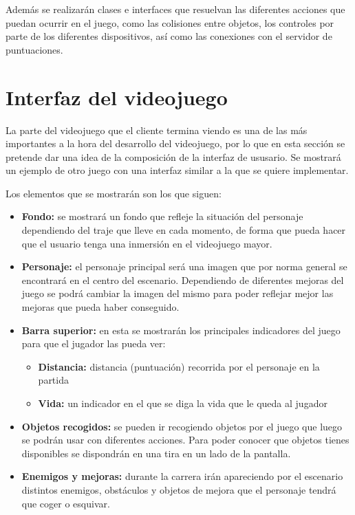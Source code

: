 \documentclass[palatino]{apuntes}
\begin{document}
Además se realizarán clases e interfaces que resuelvan las diferentes acciones que puedan ocurrir en el juego, como las colisiones entre objetos, los controles por parte de los diferentes dispositivos, así como las conexiones con el servidor de puntuaciones.


\section{Interfaz del videojuego}
La parte del videojuego que el cliente termina viendo es una de las más importantes a la hora del desarrollo del videojuego, por lo que en esta sección se pretende dar una idea de la composición de la interfaz de ususario. Se mostrará un ejemplo de otro juego con una interfaz similar a la que se quiere implementar.

Los elementos que se mostrarán son los que siguen:
\begin{itemize}
	\item \textbf{Fondo:} se mostrará un fondo que refleje la situación del personaje dependiendo del traje que lleve en cada momento, de forma que pueda hacer que el usuario tenga una inmersión en el videojuego mayor.
	\item \textbf{Personaje:} el personaje principal será una imagen que por norma general se encontrará en el centro del escenario. Dependiendo de diferentes mejoras del juego se podrá cambiar la imagen del mismo para poder reflejar mejor las mejoras que pueda haber conseguido.
	\item \textbf{Barra superior:} en esta se mostrarán los principales indicadores del juego para que el jugador las pueda ver:
		\begin{itemize}
			\item \textbf{Distancia:} distancia (puntuación) recorrida por el personaje en la partida
			\item \textbf{Vida:} un indicador en el que se diga la vida que le queda al jugador
		\end{itemize}
	\item \textbf{Objetos recogidos:} se pueden ir recogiendo objetos por el juego que luego se podrán usar con diferentes acciones. Para poder conocer que objetos tienes disponibles se dispondrán en una tira en un lado de la pantalla.
	
	\item \textbf{Enemigos y mejoras:} durante la carrera irán apareciendo por el escenario distintos enemigos, obstáculos y objetos de mejora que el personaje tendrá que coger o esquivar.
\end{itemize}
\end{document}
